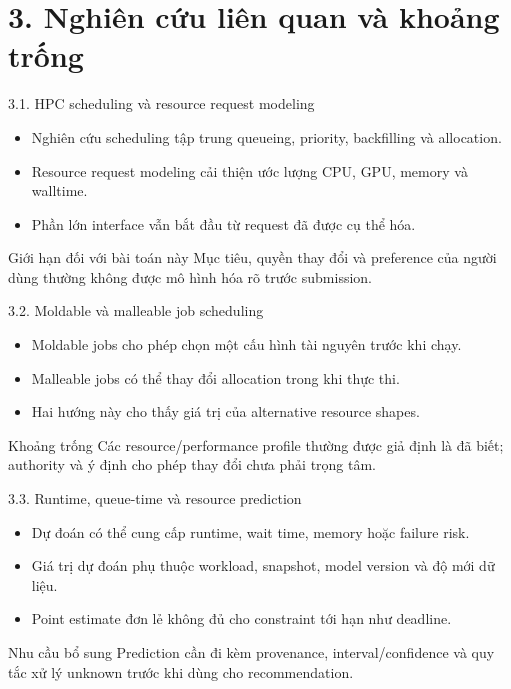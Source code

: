 \section{3. Nghiên cứu liên quan và khoảng trống}

\begin{frame}[t]{3.1. HPC scheduling và resource request modeling}
\small
\begin{itemize}
  \item Nghiên cứu scheduling tập trung queueing, priority, backfilling và allocation.
  \item Resource request modeling cải thiện ước lượng CPU, GPU, memory và walltime.
  \item Phần lớn interface vẫn bắt đầu từ request đã được cụ thể hóa.
\end{itemize}
\begin{block}{Giới hạn đối với bài toán này}
Mục tiêu, quyền thay đổi và preference của người dùng thường không được mô hình hóa rõ trước submission.
\end{block}
\end{frame}

\begin{frame}[t]{3.2. Moldable và malleable job scheduling}
\small
\begin{itemize}
  \item Moldable jobs cho phép chọn một cấu hình tài nguyên trước khi chạy.
  \item Malleable jobs có thể thay đổi allocation trong khi thực thi.
  \item Hai hướng này cho thấy giá trị của alternative resource shapes.
\end{itemize}
\begin{alertblock}{Khoảng trống}
Các resource/performance profile thường được giả định là đã biết; authority và ý định cho phép thay đổi chưa phải trọng tâm.
\end{alertblock}
\end{frame}

\begin{frame}[t]{3.3. Runtime, queue-time và resource prediction}
\small
\begin{itemize}
  \item Dự đoán có thể cung cấp runtime, wait time, memory hoặc failure risk.
  \item Giá trị dự đoán phụ thuộc workload, snapshot, model version và độ mới dữ liệu.
  \item Point estimate đơn lẻ không đủ cho constraint tới hạn như deadline.
\end{itemize}
\begin{block}{Nhu cầu bổ sung}
Prediction cần đi kèm provenance, interval/confidence và quy tắc xử lý unknown trước khi dùng cho recommendation.
\end{block}
\end{frame}

